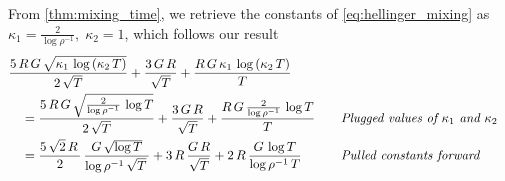\begin{proofEnd}
  From \cref{thm:mixing_time}, we retrieve the constants of \cref{eq:hellinger_mixing} as
  \(
  \kappa_1=\frac{2}{\log \rho^{-1} },\;  \kappa_2 = 1
  \), which follows our result
  \begin{alignat*}{2}
    &\frac{
      5 \, R \, G \, \sqrt{\kappa_1 \, \log \left(\kappa_2 \, T\right) }
    }{
      2 \, \sqrt{T}
    }
    +
    \frac{3 \, G \, R}{\sqrt{T}}
    +
    \frac{R \, G \, \kappa_1 \, \log \left(\kappa_2 \, T\right)}{T}
    \\
    &\quad=
    \frac{
      5 \, R \, G \, \sqrt{ \frac{2}{\log \rho^{-1}} \, \log T }
    }{
      2 \, \sqrt{T}
    }
    +
    \frac{3 \, G \, R}{\sqrt{T}}
    +
    \frac{R \, G \, \frac{2}{\log \rho^{-1}} \, \log T}{T}
    &&\quad\text{\textit{Plugged values of \(\kappa_1\) and \(\kappa_2\)}}
    \\
    &\quad=
    \frac{
      5 \, \sqrt{2} \, R \, 
    }{
      2
    }
    \,
    \frac{
      G \, \sqrt{\log T}
    }{
      \log \rho^{-1} \, \sqrt{T} \, 
    }
    +
    3 \, R \,
    \frac{G \, R}{\sqrt{T}}
    +
    2 \, R
    \,
    \frac{G \, \log T}{ \log \rho^{-1} \, T}
    &&\quad\text{\textit{Pulled constants forward}}
  \end{alignat*}
\end{proofEnd}

